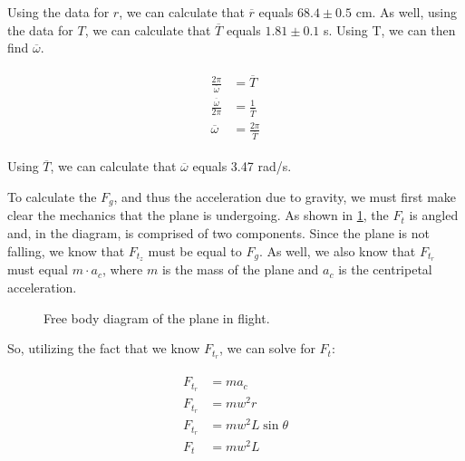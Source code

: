\documentclass[12pt]{article}
\begin{document}
Using the data for $r$, we can calculate that $\overline{r}$ equals $68.4 \pm
0.5$ cm. As well, using the data for $T$, we can calculate that $\overline{T}$
equals $1.81 \pm 0.1$ s. Using T, we can then find $\overline{\omega}$.

\begin{align*}
    \begin{split}
        \frac{2 \pi}{\overline{\omega}} &= \overline{T} \\
        \frac{\overline{\omega}}{2 \pi} &= \frac{1}{\overline{T}} \\
        \overline{\omega} &= \frac{2 \pi}{\overline{T}} 
    \end{split}
\end{align*}

Using $\overline{T}$, we can calculate that $\overline{\omega}$ equals 3.47
rad/s.

To calculate the $F_g$, and thus the acceleration due to gravity, we must first
make clear the mechanics that the plane is undergoing. As shown in
\ref{fig:fbd}, the $F_t$ is angled and, in the diagram, is comprised of two
components. Since the plane is not falling, we know that $F_{t_z}$ must be equal
to $F_g$. As well, we also know that $F_{t_r}$ must equal $m \cdot a_c$, where
$m$ is the mass of the plane and $a_c$ is the centripetal acceleration.

\begin{figure}[h]
    \centering
    \caption{Free body diagram of the plane in flight.}
    \label{fig:fbd}
\end{figure} 

So, utilizing the fact that we know $F_{t_r}$, we can solve for $F_t$:

\begin{align*}
    \begin{split}
        F_{t_r} &= m a_c \\ 
        F_{t_r} &= m w^2 r \\
        F_{t_r} &= m w^2 L \sin \theta \\
        F_t &= m w^2 L
    \end{split}
\end{align*}
\end{document}
